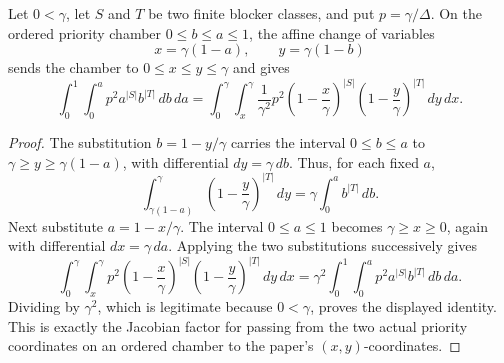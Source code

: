 \begin{helper}
Let \(0<\gamma\), let \(S\) and \(T\) be two finite blocker classes, and put
\(p=\gamma/\Delta\).  On the ordered priority chamber \(0\le b\le a\le1\),
the affine change of variables
\[
x=\gamma(1-a),\qquad y=\gamma(1-b)
\]
sends the chamber to \(0\le x\le y\le\gamma\) and gives
\[
\int_0^1\int_0^a
p^2 a^{|S|}b^{|T|}\,db\,da
=
\int_0^\gamma\int_x^\gamma
\frac1{\gamma^2}p^2
\left(1-\frac{x}{\gamma}\right)^{|S|}
\left(1-\frac{y}{\gamma}\right)^{|T|}\,dy\,dx .
\]
\end{helper}
\begin{proof}
The substitution \(b=1-y/\gamma\) carries the interval \(0\le b\le a\) to
\(\gamma\ge y\ge \gamma(1-a)\), with differential \(dy=\gamma\,db\).  Thus,
for each fixed \(a\),
\[
\int_{\gamma(1-a)}^\gamma
\left(1-\frac{y}{\gamma}\right)^{|T|}\,dy
=
\gamma\int_0^a b^{|T|}\,db .
\]
Next substitute \(a=1-x/\gamma\).  The interval \(0\le a\le1\) becomes
\(\gamma\ge x\ge0\), again with differential \(dx=\gamma\,da\).  Applying the
two substitutions successively gives
\[
\int_0^\gamma\int_x^\gamma
p^2\left(1-\frac{x}{\gamma}\right)^{|S|}
\left(1-\frac{y}{\gamma}\right)^{|T|}\,dy\,dx
=
\gamma^2\int_0^1\int_0^a p^2a^{|S|}b^{|T|}\,db\,da .
\]
Dividing by \(\gamma^2\), which is legitimate because \(0<\gamma\), proves the
displayed identity.  This is exactly the Jacobian factor for passing from the
two actual priority coordinates on an ordered chamber to the paper's
\((x,y)\)-coordinates.
\end{proof}
